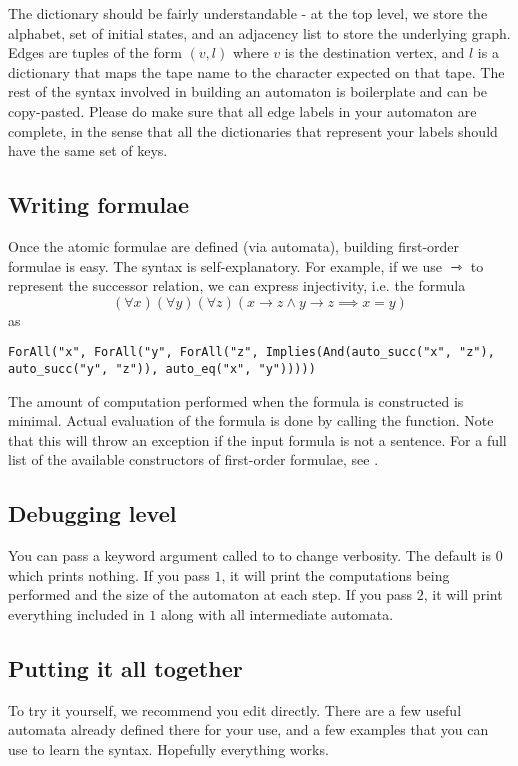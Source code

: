 \documentclass{hw}
\begin{document}
The dictionary should be fairly understandable - at the top level, we store
the alphabet, set of initial states, and an adjacency list to store the
underlying graph. Edges are tuples of the form $(v, l)$ where $v$ is the
destination vertex, and $l$ is a dictionary that maps the tape name to the
character expected on that tape. The rest of the syntax involved
in building an automaton is boilerplate and can be copy-pasted.
Please do make sure that all edge labels in your automaton are complete,
in the sense that all the dictionaries that represent your labels should
have the same set of keys.

\subsection*{Writing formulae}
Once the atomic formulae are defined (via automata), building first-order formulae
is easy. The syntax is self-explanatory. For example, if we use $\rightarrowtriangle$
to represent the successor relation, we can express injectivity, i.e. the formula
$$(\forall x)(\forall y)(\forall z)(x \rightarrow z \wedge y \rightarrow z \implies x = y)$$
as
\begin{lstlisting}
ForAll("x", ForAll("y", ForAll("z", Implies(And(auto_succ("x", "z"),
auto_succ("y", "z")), auto_eq("x", "y")))))
\end{lstlisting}
The amount of computation performed when the formula is constructed is minimal.
Actual evaluation of the formula is done by calling the  function. Note that
this will throw an exception if the input formula is not a sentence.
For a full list of the available constructors of first-order formulae, see .

\subsection*{Debugging level}
You can pass a keyword argument called  to  to change
verbosity. The default is $0$ which prints nothing. If you pass $1$, it will print
the computations being performed and the size of the automaton at each step. If
you pass $2$, it will print everything included in $1$ along with all intermediate automata.

\subsection*{Putting it all together}
To try it yourself, we recommend you edit  directly. There are a few useful
automata already defined there for your use, and a few examples that you can use to learn
the syntax. Hopefully everything works.
\end{document}
